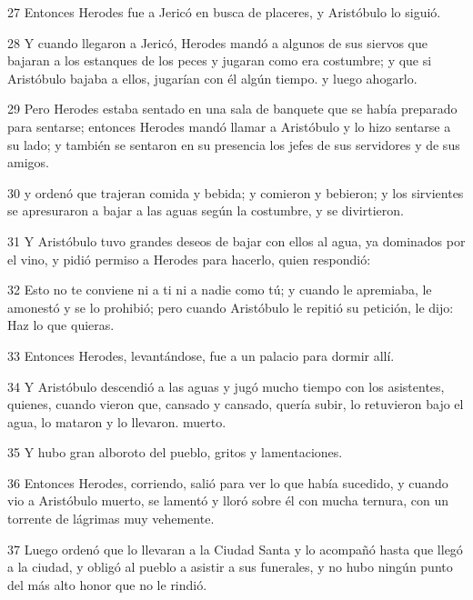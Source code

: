 \par 27 Entonces Herodes fue a Jericó en busca de placeres, y Aristóbulo lo siguió.

\par 28 Y cuando llegaron a Jericó, Herodes mandó a algunos de sus siervos que bajaran a los estanques de los peces y jugaran como era costumbre; y que si Aristóbulo bajaba a ellos, jugarían con él algún tiempo. y luego ahogarlo.

\par 29 Pero Herodes estaba sentado en una sala de banquete que se había preparado para sentarse; entonces Herodes mandó llamar a Aristóbulo y lo hizo sentarse a su lado; y también se sentaron en su presencia los jefes de sus servidores y de sus amigos.

\par 30 y ordenó que trajeran comida y bebida; y comieron y bebieron; y los sirvientes se apresuraron a bajar a las aguas según la costumbre, y se divirtieron.

\par 31 Y Aristóbulo tuvo grandes deseos de bajar con ellos al agua, ya dominados por el vino, y pidió permiso a Herodes para hacerlo, quien respondió:

\par 32 Esto no te conviene ni a ti ni a nadie como tú; y cuando le apremiaba, le amonestó y se lo prohibió; pero cuando Aristóbulo le repitió su petición, le dijo: Haz lo que quieras.

\par 33 Entonces Herodes, levantándose, fue a un palacio para dormir allí.

\par 34 Y Aristóbulo descendió a las aguas y jugó mucho tiempo con los asistentes, quienes, cuando vieron que, cansado y cansado, quería subir, lo retuvieron bajo el agua, lo mataron y lo llevaron. muerto.

\par 35 Y hubo gran alboroto del pueblo, gritos y lamentaciones.

\par 36 Entonces Herodes, corriendo, salió para ver lo que había sucedido, y cuando vio a Aristóbulo muerto, se lamentó y lloró sobre él con mucha ternura, con un torrente de lágrimas muy vehemente.

\par 37 Luego ordenó que lo llevaran a la Ciudad Santa y lo acompañó hasta que llegó a la ciudad, y obligó al pueblo a asistir a sus funerales, y no hubo ningún punto del más alto honor que no le rindió.

